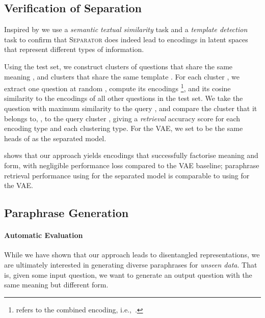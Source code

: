 \documentclass[11pt,a4paper]{article}
\begin{document}
\subsection{Verification of Separation}

Inspired by \citet{chen-etal-2019-multi} we use a \textit{semantic textual similarity} task and a \textit{template detection} task to confirm that \textsc{Separator} does indeed lead to encodings  in latent spaces that represent different types of information. 

Using the test set, we construct clusters of questions that share the
same meaning , and clusters that share the same
template . For each cluster , we extract one question at
random , compute its encodings
\footnote{ refers to the combined encoding,
i.e.,~.}, and its cosine
similarity to the encodings of all other questions in the test set. We
take the question with maximum similarity to the query , and compare
the cluster that it belongs to, , to the query cluster , giving a \textit{retrieval} accuracy score for each encoding
type and each clustering type. For the VAE, we set
 to be the same heads of
 as the separated model.






 shows that our approach yields encodings that successfully factorise meaning and form, with negligible performance loss compared to the VAE baseline; paraphrase retrieval performance using  for the separated model is comparable to using  for the VAE.
















\subsection{Paraphrase Generation}

\paragraph{Automatic Evaluation} 
While we have shown that our approach leads to disentangled
representations, we are ultimately interested in generating diverse
paraphrases for \textit{unseen data}. That is, given some input
question, we want to generate an output question with the same meaning
but different form.
\end{document}
